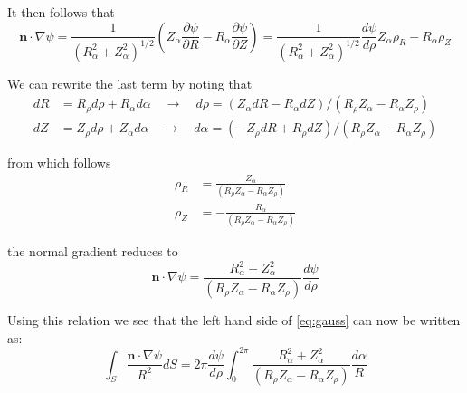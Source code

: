 It then follows that
\begin{equation}
	\mathbf { n } \cdot \nabla \psi = \frac { 1 } { \left( R _ { \alpha } ^ { 2 } + Z _ { \alpha } ^ { 2 } \right) ^ { 1 / 2 } } \left( Z _ { \alpha } \frac { \partial \psi } { \partial R } - R _ { \alpha } \frac { \partial \psi } { \partial Z } \right) = \frac { 1 } { \left( R _ { \alpha } ^ { 2 } + Z _ { \alpha } ^ { 2 } \right) ^ { 1 / 2 } } \frac { d \psi } { d \rho } Z _ { \alpha } \rho _ { R } - R _ { \alpha } \rho _ { Z }
\end{equation}

We can rewrite the last term by noting that
\begin{equation}
	\begin{aligned} 
	d R & = R _ { \rho } d \rho + R _ { \alpha } d \alpha \quad \rightarrow \quad d \rho = \left( Z _ { \alpha } d R - R _ { \alpha } d Z \right) / \left( R _ { \rho } Z _ { \alpha } - R _ { \alpha } Z _ { \rho } \right) \\ d Z & = Z _ { \rho } d \rho + Z _ { \alpha } d \alpha \quad \rightarrow \quad d \alpha = \left( - Z _ { \rho } d R + R _ { \rho } d Z \right) / \left( R _ { \rho } Z _ { \alpha } - R _ { \alpha } Z _ { \rho } \right) 
	\end{aligned}
\end{equation}

from which follows
\begin{equation}
	\begin{aligned} 
		\rho _ { R } & = \frac { Z _ { \alpha } } { \left( R _ { \rho } Z _ { \alpha } - R _ { \alpha } Z _ { \rho } \right) } \\ \rho _ { Z } & = - \frac { R _ { \alpha } } { \left( R _ { \rho } Z _ { \alpha } - R _ { \alpha } Z _ { \rho } \right) } 
	\end{aligned}
\end{equation}

the normal gradient reduces to
\begin{equation}
	\mathbf { n } \cdot \nabla \psi = \frac { R _ { \alpha } ^ { 2 } + Z _ { \alpha } ^ { 2 } } { \left( R _ { \rho } Z _ { \alpha } - R _ { \alpha } Z _ { \rho } \right) } \frac { d \psi } { d \rho }
\end{equation}

Using this relation we see that the left hand side of \cref{eq:gauss} can now be written as:
\begin{equation}
	\label{eq:bs_part1}
	\int _ { S } \frac { \mathbf { n } \cdot \nabla \psi } { R ^ { 2 } } d S = 2 \pi \frac { d \psi } { d \rho } \int _ { 0 } ^ { 2 \pi } \frac { R _ { \alpha } ^ { 2 } + Z _ { \alpha } ^ { 2 } } { \left( R _ { \rho } Z _ { \alpha } - R _ { \alpha } Z _ { \rho } \right) } \frac { d \alpha } { R }
\end{equation}

